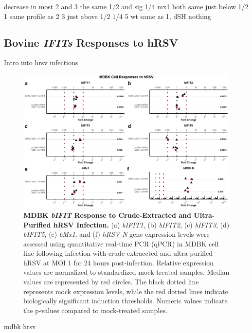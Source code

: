 decrease in most
2 and 3 the same
1/2 and sig 1/4
mx1 both same just below 1/2
1 same profile as 2 3 
    just above 1/2 1/4
5 wt same as 1, dSH nothing    

\subsection{Bovine \textit{IFITs} Responses to hRSV} \label{subsec:Bovine IFITs Responses to hRSV}

Intro into hrsv infections


\begin{figure}
    \centering
    \includegraphics[width=1\linewidth]{07. Chapter 2/Figs/02. Induction/07. mdbk_hrsv.pdf}
    \caption[MDBK \textit{bIFIT} Response to Crude-Extracted and Ultra-Purified hRSV Infection.]{\textbf{MDBK \textit{bIFIT} Response to Crude-Extracted and Ultra-Purified hRSV Infection.} (a) \textit{bIFIT1}, (b) \textit{bIFIT2}, (c) \textit{bIFIT3}, (d) \textit{bIFIT5}, (e) \textit{bMx1}, and (f) \textit{hRSV N} gene expression levels were assessed using quantitative real-time PCR (qPCR) in MDBK cell line following infection with crude-extraccted and ultra-purified hRSV at MOI 1 for 24 hours post-infection. Relative expression values are normalized to standardized mock-treated samples. Median values are represented by red circles. The black dotted line represents mock expression levels, while the red dotted lines indicate biologically significant induction thresholds. Numeric values indicate the p-values compared to mock-treated samples.}
    \label{fig:bIFIT responses to hRSV infection in MDBK}
\end{figure}

mdbk hrsv

